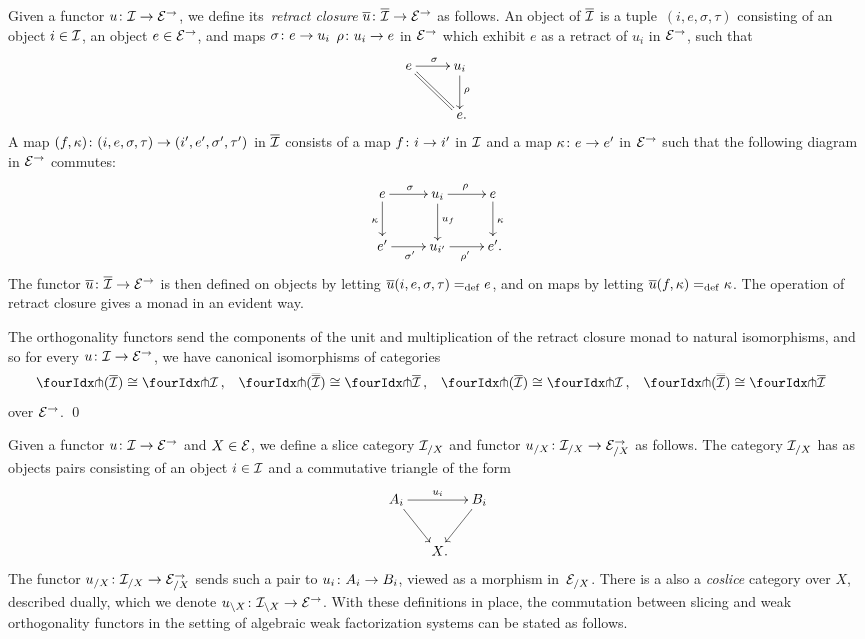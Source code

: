 \documentclass[reqno,10pt,a4paper,oneside,draft]{amsart}
\begin{document}
{{Given a functor $u \co \cal{I} \to \calE^\to$, we define its~\emph{retract closure} $\overline{u} \co \overline{\cal{I}} \to \catE^\to$ as follows.
An object of $\overline{\cal{I}}$ is a tuple~$(i, e, \sigma, \tau)$ consisting of an object $i \in \cal{I}$, an object $e \in \catE^\to$, and maps $\sigma \co e \rightarrow u_i$ $\rho \co u_i \rightarrow e$ in $\catE^\to$ which exhibit $e$ as a retract of $u_i$ in $\catE^\to$, \ie such that
\[
\xymatrix{
  e
  \ar[r]^{\sigma}
  \ar@{=}[dr]
&
  u_i
  \ar[d]^{\rho}
\\&
  e
\rlap{.}}
\]
A map $(f, \kappa) \co (i, e, \sigma, \tau) \to (i', e', \sigma', \tau')$ in $\overline{\cal{I}}$ consists of a map $f \co i \to i'$ in $\cal{I}$ and a map $\kappa \co e \rightarrow e'$ in $\catE^\to$ such that the following diagram in $\catE^\to$ commutes:
\[
\xymatrix{
  e
  \ar[r]^{\sigma}
  \ar[d]_{\kappa}
&
  u_i
  \ar[r]^{\rho}
  \ar[d]^{u_f}
&
  e
  \ar[d]^{\kappa}
\\
  e'
  \ar[r]_{\sigma'}
&
  u_{i'}
  \ar[r]_{\rho'}
&
  e'
\rlap{.}}
\]
The functor $\overline{u} \co \overline{\cal{I}} \to \catE^\to$ is then defined on objects by letting $\overline{u}(i, e, \sigma, \tau) \defeq e$, and on maps by letting $\overline{u}(f, \kappa) \defeq \kappa$.
The operation of retract closure gives a monad in an evident way. 

\begin{proposition} \label{retract-closure}
The orthogonality functors send the components of the unit and multiplication of the retract closure monad to natural isomorphisms, and so for every $u \co \cal{I} \to \catE^\to$, we have canonical isomorphisms of categories
\[
\begin{aligned}
  \liftr{(\overline{\cal{I}})} &\iso \liftr{\cal{I}}
\, ,&
  \liftr{(\overline{\overline{\cal{I}}})} &\iso \liftr{\overline{\cal{I}}}
\, ,&
  \liftl{(\overline{\cal{I}})} &\iso \liftl{\cal{I}}
\, ,&
 \liftl{(\overline{\overline{\cal{I}}})} &\iso \liftl{\overline{\cal{I}}}
\end{aligned}
\]
over $\catE^\to$.
\qed
\end{proposition}



Given a functor $u \co \cal{I} \to \catE^\to$ and $X \in \catE$, we define a slice category $\cal{I}_{/X}$ and functor $u_{/X} \co \cal{I}_{/X} \to \catE_{/X}^\to$ as follows.
The category $\cal{I}_{/X}$ has as objects pairs consisting of an object $i \in \cal{I}$ and a commutative triangle of the form
\[
\xymatrix@C-1em{
  A_i
  \ar[dr]
  \ar[rr]^{u_i}
&&
  B_i
  \ar[dl]
\\&
  X
\rlap{.}}
\]
The functor $u_{/X} \co \cal{I}_{/X} \to \catE_{/X}^\to$ sends such a pair to $u_i \co A_i \to B_i$, viewed as a morphism in~$\catE_{/X}$.
There is a also a \emph{coslice} category over $X$, described dually,  which we denote $u_{\backslash X} \co  \cal{I}_{\backslash X} 
\to \catE^\to$. With these definitions in place, the commutation between slicing and weak orthogonality functors in the setting of algebraic weak factorization systems can be stated as follows.

}}
\end{document}
